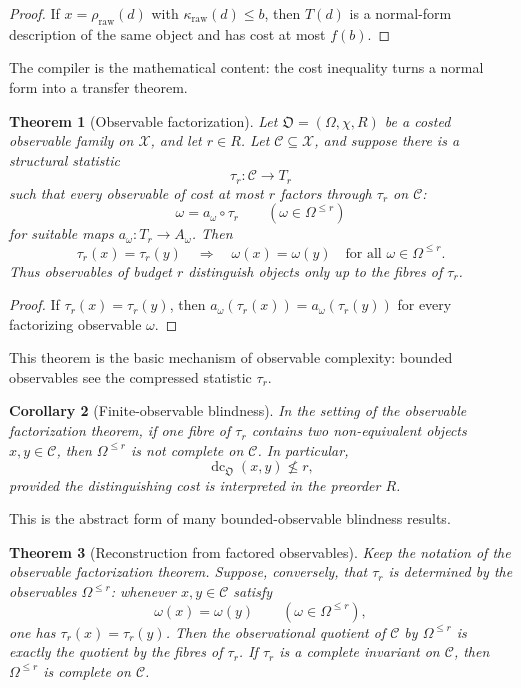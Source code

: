 \documentclass[11pt]{article}
\newtheorem{theorem}{Theorem}[section]
\newtheorem{corollary}[theorem]{Corollary}
\begin{document}
\begin{proof}
If \(x=\rho_{\mathrm{raw}}(d)\) with \(\kappa_{\mathrm{raw}}(d)\leq b\), then \(T(d)\) is a normal-form description of the same object and has cost at most \(f(b)\).
\end{proof}

The compiler is the mathematical content: the cost inequality turns a normal form into a transfer theorem.

\begin{theorem}[Observable factorization]
Let \(\mathfrak O=(\Omega,\chi,R)\) be a costed observable family on \(\mathcal X\), and let \(r\in R\). Let \(\mathcal C\subseteq\mathcal X\), and suppose there is a structural statistic
\[
\tau_r:\mathcal C\to T_r
\]
such that every observable of cost at most \(r\) factors through \(\tau_r\) on \(\mathcal C\):
\[
\omega=a_\omega\circ\tau_r
\qquad
(\omega\in\Omega^{\leq r})
\]
for suitable maps \(a_\omega:T_r\to A_\omega\). Then
\[
\tau_r(x)=\tau_r(y)
\quad\Longrightarrow\quad
\omega(x)=\omega(y)
\quad
\text{for all }\omega\in\Omega^{\leq r}.
\]
Thus observables of budget \(r\) distinguish objects only up to the fibres of \(\tau_r\).
\end{theorem}

\begin{proof}
If \(\tau_r(x)=\tau_r(y)\), then \(a_\omega(\tau_r(x))=a_\omega(\tau_r(y))\) for every factorizing observable \(\omega\).
\end{proof}

This theorem is the basic mechanism of observable complexity: bounded observables see the compressed statistic \(\tau_r\).

\begin{corollary}[Finite-observable blindness]
In the setting of the observable factorization theorem, if one fibre of \(\tau_r\) contains two non-equivalent objects \(x,y\in\mathcal C\), then \(\Omega^{\leq r}\) is not complete on \(\mathcal C\). In particular,
\[
\operatorname{dc}_{\mathfrak O}(x,y)\not\leq r,
\]
provided the distinguishing cost is interpreted in the preorder \(R\).
\end{corollary}

This is the abstract form of many bounded-observable blindness results.

\begin{theorem}[Reconstruction from factored observables]
Keep the notation of the observable factorization theorem. Suppose, conversely, that \(\tau_r\) is determined by the observables \(\Omega^{\leq r}\): whenever \(x,y\in\mathcal C\) satisfy
\[
\omega(x)=\omega(y)
\qquad(\omega\in\Omega^{\leq r}),
\]
one has \(\tau_r(x)=\tau_r(y)\). Then the observational quotient of \(\mathcal C\) by \(\Omega^{\leq r}\) is exactly the quotient by the fibres of \(\tau_r\). If \(\tau_r\) is a complete invariant on \(\mathcal C\), then \(\Omega^{\leq r}\) is complete on \(\mathcal C\).
\end{theorem}
\end{document}
